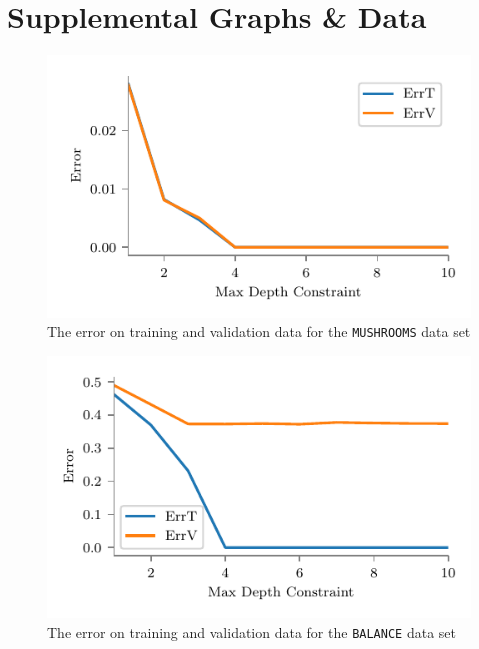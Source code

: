 \documentclass[screen, authorversion, nonacm, sigconf]{acmart}
\begin{document}
\appendix

\section{Supplemental Graphs \& Data}

\begin{figure}[H]
  \centering
  \includegraphics[width=\columnwidth]{figures/chart_errt_errv_mushrooms_ours.pdf}
  \caption{The error on training and validation data for the \texttt{MUSHROOMS} data set}
  \label{fig:mushroomserrterrv}
\end{figure}

\begin{figure}[H]
  \centering
  \includegraphics[width=\columnwidth]{figures/chart_errt_errv_balance_ours.pdf}
  \caption{The error on training and validation data for the \texttt{BALANCE} data set}
  \label{fig:balanceerrterrv}
\end{figure}
\end{document}
